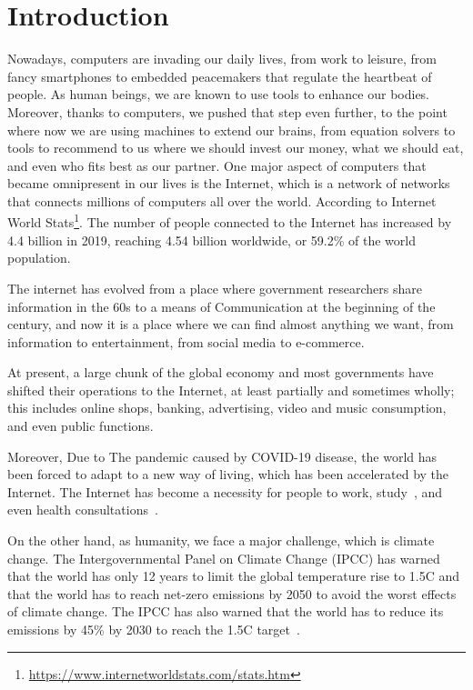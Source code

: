 \chapter{Introduction}
\label{chapter:introduction}

Nowadays, computers are invading our daily lives, from work to leisure, from fancy smartphones to embedded peacemakers that regulate the heartbeat of people.
As human beings, we are known to use tools to enhance our bodies. Moreover, thanks to computers, we pushed that step even further, to the point where now we are using machines to extend our brains, from equation solvers to tools to recommend to us where we should invest our money, what we should eat, and even who fits best as our partner.
One major aspect of computers that became omnipresent in our lives is the Internet, which is a network of networks that connects millions of computers all over the world. According to Internet World Stats\footnote{\url{https://www.internetworldstats.com/stats.htm}}. The number of people connected to the Internet has increased by 4.4 billion in 2019, reaching 4.54 billion worldwide, or 59.2\% of the world population.

The internet has evolved from a place where government researchers share information in the 60s to a means of Communication at the beginning of the century, and now it is a place where we can find almost anything we want, from information to entertainment, from social media to e-commerce.

At present, a large chunk of the global economy and most governments have shifted their operations to the Internet, at least partially and sometimes wholly; this includes online shops, banking, advertising, video and music consumption, and even public functions.

Moreover, Due to The pandemic caused by COVID-19 disease, the world has been forced to adapt to a new way of living, which has been accelerated by the Internet. The Internet has become a necessity for people to work, study~\cite{naresh2020education}, and even health consultations~\cite{liaw2021primary}.

On the other hand, as humanity, we face a major challenge, which is climate change. The Intergovernmental Panel on Climate Change (IPCC) has warned that the world has only 12 years to limit the global temperature rise to 1.5\degree C and that the world has to reach net-zero emissions by 2050 to avoid the worst effects of climate change. The IPCC has also warned that the world has to reduce its emissions by 45\% by 2030 to reach the 1.5\degree C target~\cite{portner2022climate}.

